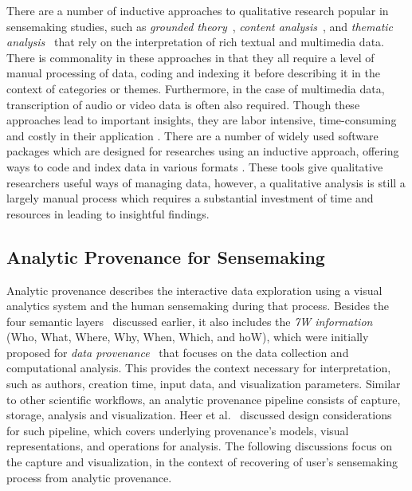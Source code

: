 There are a number of inductive approaches to qualitative research popular in sensemaking studies, such as \textit{grounded theory}~\cite{corbin1994grounded}, \textit{content analysis}~\cite{stemler2001overview}, and \textit{thematic analysis}~\cite{guest2011applied} that rely on the interpretation of rich textual and multimedia data. There is commonality in these approaches in that they all require a level of manual processing of data, coding and indexing it before describing it in the context of categories or themes. Furthermore, in the case of multimedia data, transcription of audio or video data is often also required. Though these approaches lead to important insights, they are labor intensive, time-consuming and costly in their application \cite{wong2002analysing}. There are a number of widely used software packages which are designed for researches using an inductive approach, offering ways to code and index data in various formats \cite{lewins2007using}. These tools give qualitative researchers useful ways of managing data, however, a qualitative analysis is still a largely manual process which requires a substantial investment of time and resources in leading to insightful findings.

\subsection{Analytic Provenance for Sensemaking}
Analytic provenance describes the interactive data exploration using a visual analytics system and the human sensemaking during that process. Besides the four semantic layers~\cite{Gotz2009} discussed earlier, it also includes the \textit{7W information}~\cite{provenance-7w} (Who, What, Where, Why, When,
Which, and hoW), which were initially proposed for \emph{data provenance}~\cite{data-provenance-survey-sigmod,data-provenance-survey-acm, data-provenance-survey-2008} that focuses on the data collection and computational analysis. This provides the context necessary for interpretation, such as authors, creation time, input data, and visualization parameters. Similar to other scientific workflows, an analytic provenance pipeline consists of capture, storage, analysis and visualization. Heer et al.~\cite{Heer2008} discussed design considerations for such pipeline, which covers underlying provenance's models, visual representations, and operations for analysis. The following discussions focus on the capture and visualization, in the context of recovering of user's sensemaking process from analytic provenance.

